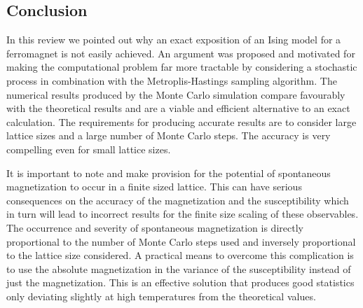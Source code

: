 \documentclass[a4paper]{article}
\begin{document}
\subsection{Conclusion}
In this review we pointed out why an exact exposition of an Ising model for a ferromagnet is not easily achieved. An argument was proposed and motivated for making the computational problem far more tractable by considering a stochastic process in combination with the Metroplis-Hastings sampling algorithm. The numerical results produced by the Monte Carlo simulation compare
favourably with the theoretical results and are a
viable and efficient alternative to an exact calculation. The
requirements for producing accurate results are to 
consider large lattice sizes and a large number of Monte Carlo steps. The accuracy is very compelling even for small lattice sizes.

It is important to note and make provision for the potential of spontaneous magnetization to occur in a finite sized lattice. This can have serious consequences on the accuracy of the magnetization and the susceptibility which in turn will lead to incorrect results for the finite size scaling of these observables.
The occurrence and severity of spontaneous magnetization is directly proportional to the number of Monte Carlo steps used and inversely proportional to the lattice size considered. A practical means to overcome this complication is to use the absolute magnetization in the variance of the susceptibility instead of just the magnetization. This is an effective solution that produces good statistics only deviating slightly at high temperatures from the theoretical values. 
\end{document}
